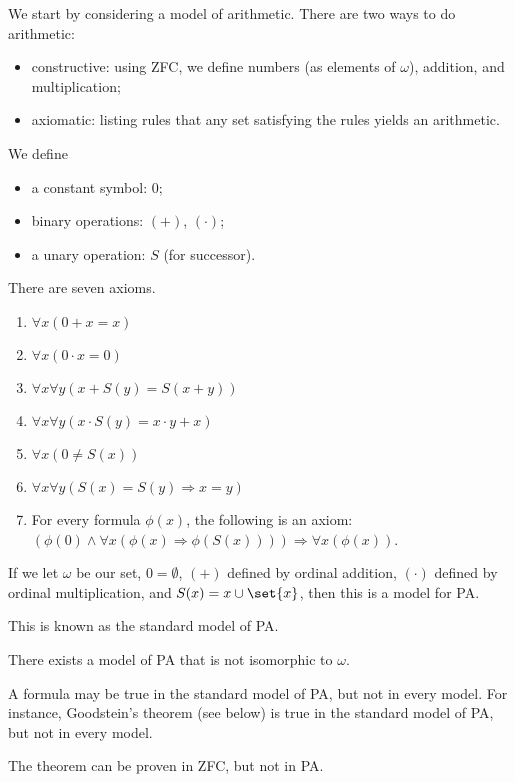 \documentclass[10pt]{mypackage}
\begin{document}
We start by considering a model of arithmetic. There are two ways to do arithmetic:
\begin{itemize}
  \item constructive: using ZFC, we define numbers (as elements of $\omega$), addition, and multiplication;
  \item axiomatic: listing rules that any set satisfying the rules yields an arithmetic.
\end{itemize}
\begin{definition}
  We define
  \begin{itemize}
    \item a constant symbol: $0$;
    \item binary operations: $\left(+\right)$, $\left(\cdot\right)$;
    \item a unary operation: $S$ (for successor).
  \end{itemize}
  There are seven axioms.
  \begin{enumerate}[(1)]
    \item $\forall x \left(0 + x = x\right)$
    \item $\forall x \left(0\cdot x = 0\right)$
    \item $\forall x \forall y \left(x + S\left(y\right) = S\left(x+y\right)\right)$
    \item $\forall x \forall y \left(x\cdot S(y) = x\cdot y + x\right)$
    \item $\forall x \left(0 \neq S(x)\right)$
    \item $\forall x \forall y \left(S(x) = S(y) \Rightarrow x=y\right)$
    \item For every formula $\phi(x)$, the following is an axiom: $\left(\phi(0) \wedge \forall x \left(\phi(x)\Rightarrow \phi\left(S(x)\right)\right)\right)\Rightarrow \forall x \left(\phi(x)\right)$.
  \end{enumerate}
\end{definition}
\begin{theorem}
  If we let $\omega$ be our set, $0 = \emptyset$, $\left(+\right)$ defined by ordinal addition, $\left(\cdot\right)$ defined by ordinal multiplication, and $S(x) = x\cup \set{x}$, then this is a model for PA.\newline

  This is known as the standard model of PA.
\end{theorem}
\begin{theorem}
  There exists a model of PA that is not isomorphic to $\omega$.
\end{theorem}
\begin{remark}
  A formula may be true in the standard model of PA, but not in every model. For instance, Goodstein's theorem (see below) is true in the standard model of PA, but not in every model.\newline

  The theorem can be proven in ZFC, but not in PA.
\end{remark}
\end{document}

